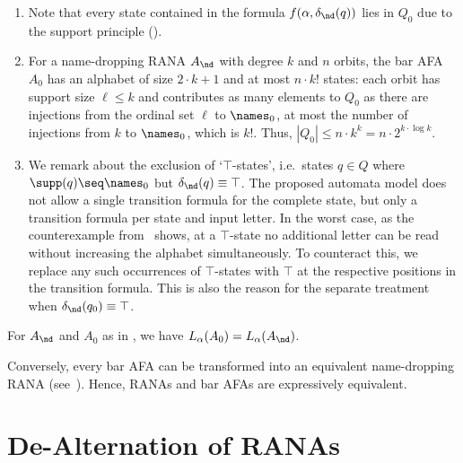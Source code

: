 \documentclass[10pt, final, conference, a4paper, twocolumn]{IEEEtran}
\renewcommand{\enquote}[1]{`#1'}
\begin{document}
\begin{rem}\label{R:barafa}
  \begin{enumerate}%
  \item Note that every state contained in the formula $f(\alpha, \delta_{\nd}(q))$ lies in $Q_0$ due to the support principle (). 
  \item\label{R:barafa:2} For a name-dropping RANA $A_{\nd}$ with degree $k$ and $n$ orbits, the bar AFA $A_0$ has an alphabet of size $2\cdot k + 1$ and at most $n \cdot k!$ states: each orbit has support size $\ell \leqslant k$ and contributes as many elements to $Q_0$ as there are injections
      from the ordinal set $\ell$ to $\names_0$, at most the number of injections from $k$ to $\names_0$, which is $k!$. Thus, $|Q_0| \leqslant n \cdot k^k = n \cdot 2^{k \cdot \log k}$.  
    \item We remark about the exclusion of \enquote{$\top$-states}, i.e.~states $q \in Q$ where
      $\supp(q) \seq \names_0$ but $\delta_{\nd}(q) \equiv \top$. The proposed automata model does not allow
      a single transition formula for the complete state, but only a transition formula per state and
      input letter. In the worst case, as the counterexample from~ shows,
      at a $\top$-state no additional letter can be read without increasing the alphabet simultaneously.
      To counteract this, we replace any such occurrences of $\top$-states with $\top$
      at the respective positions in the transition formula. This is also the reason for the separate
      treatment when $\delta_{\nd}(q_0) \equiv \top$.
  \end{enumerate}
\end{rem}

\begin{theo} \label{thm:bafaEquiv}
For $A_{\nd}$ and $A_0$ as in , we have $L_\alpha(A_0) = L_\alpha(A_{\nd})$.
\end{theo}

\begin{rem}\label{rem:bafa2rana}
Conversely, every bar AFA can be transformed into an equivalent name-dropping RANA (see~). %
Hence, RANAs and bar AFAs are expressively equivalent.
\end{rem}

\section{De-Alternation of RANAs}\label{sec:dealt}
\end{document}
